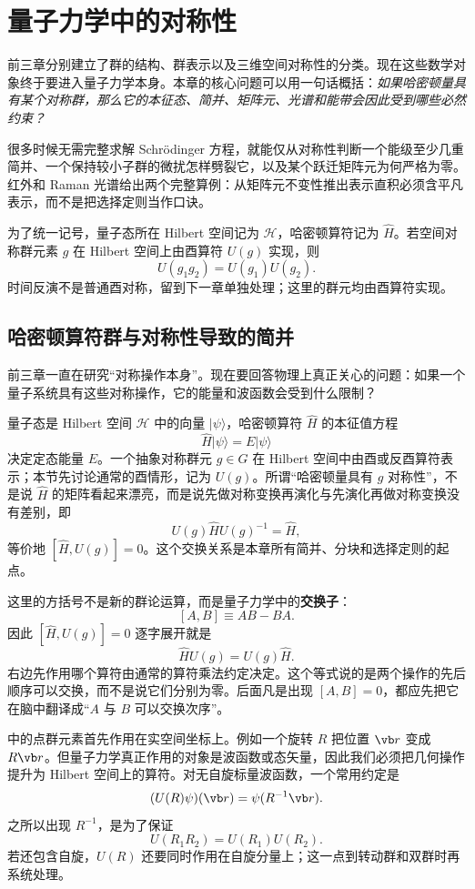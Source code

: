 \chapter{量子力学中的对称性}
\label{chap:group-theory-quantum}

前三章分别建立了群的结构、群表示以及三维空间对称性的分类。现在这些数学对象终于要进入量子力学本身。本章的核心问题可以用一句话概括：\emph{如果哈密顿量具有某个对称群，那么它的本征态、简并、矩阵元、光谱和能带会因此受到哪些必然约束？}

很多时候无需完整求解 Schrödinger 方程，就能仅从对称性判断一个能级至少几重简并、一个保持较小子群的微扰怎样劈裂它，以及某个跃迁矩阵元为何严格为零。红外和 Raman 光谱给出两个完整算例：从矩阵元不变性推出表示直积必须含平凡表示，而不是把选择定则当作口诀。

为了统一记号，量子态所在 Hilbert 空间记为 $\mathcal H$，哈密顿算符记为 $\hat H$。若空间对称群元素 $g$ 在 Hilbert 空间上由酉算符 $U(g)$ 实现，则
\[
U(g_1g_2)=U(g_1)U(g_2).
\]
时间反演不是普通酉对称，留到下一章单独处理；这里的群元均由酉算符实现。

\section{哈密顿算符群与对称性导致的简并}
\label{sec:hamiltonian-symmetry}

前三章一直在研究“对称操作本身”。现在要回答物理上真正关心的问题：如果一个量子系统具有这些对称操作，它的能量和波函数会受到什么限制？

量子态是 Hilbert 空间 $\mathcal H$ 中的向量 $|\psi\rangle$，哈密顿算符 $\hat H$ 的本征值方程
\[
\hat H|\psi\rangle=E|\psi\rangle
\]
决定定态能量 $E$。一个抽象对称群元 $g\in G$ 在 Hilbert 空间中由酉或反酉算符表示；本节先讨论通常的酉情形，记为 $U(g)$。所谓“哈密顿量具有 $g$ 对称性”，不是说 $\hat H$ 的矩阵看起来漂亮，而是说先做对称变换再演化与先演化再做对称变换没有差别，即
\[
U(g)\hat H U(g)^{-1}=\hat H,
\]
等价地 $[\hat H,U(g)]=0$。这个交换关系是本章所有简并、分块和选择定则的起点。

这里的方括号不是新的群论运算，而是量子力学中的\textbf{交换子}：
\[
[A,B]\equiv AB-BA.
\]
因此 $[\hat H,U(g)]=0$ 逐字展开就是
\[
\hat H U(g)=U(g)\hat H.
\]
右边先作用哪个算符由通常的算符乘法约定决定。这个等式说的是两个操作的先后顺序可以交换，而不是说它们分别为零。后面凡是出现 $[A,B]=0$，都应先把它在脑中翻译成“$A$ 与 $B$ 可以交换次序”。

中的点群元素首先作用在实空间坐标上。例如一个旋转 $R$ 把位置 $\vb r$ 变成 $R\vb r$。但量子力学真正作用的对象是波函数或态矢量，因此我们必须把几何操作提升为 Hilbert 空间上的算符。对无自旋标量波函数，一个常用约定是
\[
(U(R)\psi)(\vb r)=\psi(R^{-1}\vb r).
\]
之所以出现 $R^{-1}$，是为了保证
\[
U(R_1R_2)=U(R_1)U(R_2).
\]
若还包含自旋，$U(R)$ 还要同时作用在自旋分量上；这一点到转动群和双群时再系统处理。


